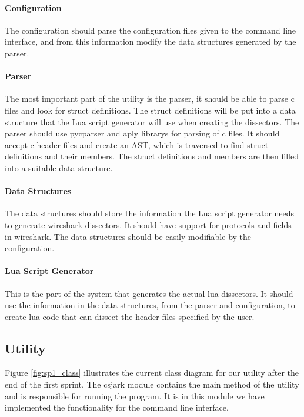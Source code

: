 \paragraph{Configuration}
The configuration should parse the configuration files given
to the command line interface, and from this information modify
the data structures generated by the parser.

\paragraph{Parser}
The most important part of the utility is the \gls{parser}, it should be able to parse \Gls{c} files and
look for \gls{struct} definitions. The \gls{struct} definitions will be put into a data structure
that the Lua script generator will use when creating the \glspl{dissector}.
The parser should use \gls{pycparser} and \gls{aply} \glspl{library} for parsing of \Gls{c} files. It should accept \Gls{c}
\gls{header} files and create an \gls{AST}, which is traversed
to find \gls{struct} definitions and their \glspl{member}. The \gls{struct} definitions and \glspl{member}
are then filled into a suitable data structure.

\paragraph{Data Structures}
The data structures should store the information the Lua script generator needs to generate
\Gls{wireshark} \glspl{dissector}. It should have support for protocols and fields in \Gls{wireshark}.
The data structures should be easily modifiable by the configuration.

\paragraph{Lua Script Generator}
This is the part of the system that generates the actual \Gls{lua} \glspl{dissector}.
It should use the information in the data structures, from the 
parser and configuration, to create \Gls{lua} code that can dissect
the \gls{header} files specified by the user. 

\subsection{Utility}
Figure \ref{fig:sp1_class} illustrates the current class diagram for our
\gls{utility} after the end of the first sprint. The csjark module contains the main
method of the \gls{utility} and is responsible for running the program.
It is in this module we have implemented the functionality for the command line interface.

